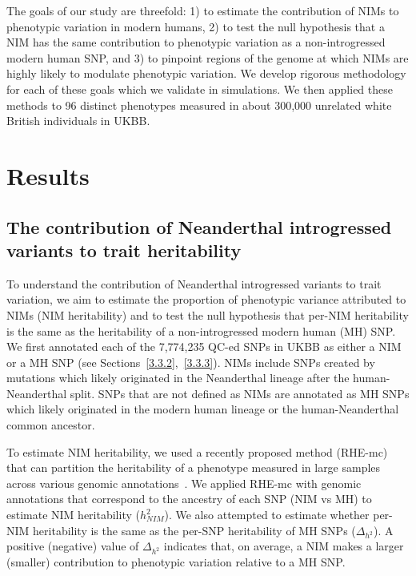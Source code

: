 The goals of our study are threefold: 1) to estimate the contribution of NIMs to phenotypic variation in modern humans, 2) to test the null hypothesis that a NIM has the same contribution to phenotypic variation as a non-introgressed modern human SNP, and 3) to pinpoint regions of the genome at which NIMs are highly likely to modulate phenotypic variation. We develop rigorous methodology for each of these goals which we validate in simulations. We then applied these methods to 96 distinct phenotypes measured in about 300,000 unrelated white British individuals in UKBB.
\section{Results}
\subsection{The contribution of Neanderthal introgressed variants to trait heritability}
To understand the contribution of Neanderthal introgressed variants to trait variation, we aim to estimate the proportion of phenotypic variance attributed to NIMs (NIM heritability) and to test the null hypothesis that per-NIM heritability is the same as the heritability of a non-introgressed modern human (MH) SNP. We first annotated each of the 7,774,235 QC-ed SNPs in UKBB as either a NIM or a MH SNP (see Sections~\ref{3.3.2},~\ref{3.3.3}). NIMs include SNPs created by mutations which likely originated in the Neanderthal lineage after the human-Neanderthal split. SNPs that are not defined as NIMs are annotated as MH SNPs which likely originated in the modern human lineage or the human-Neanderthal common ancestor. 

To estimate NIM heritability, we used a recently proposed method (RHE-mc) that can partition the heritability of a phenotype measured in large samples across various genomic annotations~\cite{pazokitoroudi2020efficient}. We applied RHE-mc with genomic annotations that correspond to the ancestry of each SNP (NIM vs MH) to estimate NIM heritability ($h^2_{NIM}$). We also attempted to estimate whether per-NIM heritability is the same as the per-SNP heritability of MH SNPs ($\Delta_{h^2}$). A positive (negative) value of $\Delta_{h^2}$ indicates that, on average, a NIM makes a larger (smaller) contribution to phenotypic variation relative to a MH SNP.

